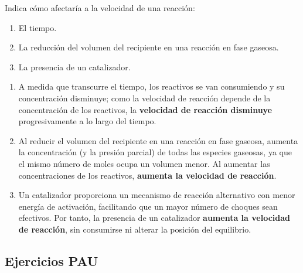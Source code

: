 \begin{question}
    Indica cómo afectaría a la velocidad de una reacción:
    \begin{enumerate}[label=\letraminuscula]
        \item El tiempo.
        \item La reducción del volumen del recipiente en una reacción en fase gaseosa.
        \item La presencia de un catalizador.
    \end{enumerate}

    \begin{solu}

        \begin{enumerate}[label=\letraminuscula]
            \item A medida que transcurre el tiempo, los reactivos se van consumiendo y su concentración disminuye; como la velocidad de reacción depende de la concentración de los reactivos, la \textbf{velocidad de reacción disminuye} progresivamente a lo largo del tiempo.
            \item Al reducir el volumen del recipiente en una reacción en fase gaseosa, aumenta la concentración (y la presión parcial) de todas las especies gaseosas, ya que el mismo número de moles ocupa un volumen menor. Al aumentar las concentraciones de los reactivos, \textbf{aumenta la velocidad de reacción}.
            \item Un catalizador proporciona un mecanismo de reacción alternativo con menor energía de activación, facilitando que un mayor número de choques sean efectivos. Por tanto, la presencia de un catalizador \textbf{aumenta la velocidad de reacción}, sin consumirse ni alterar la posición del equilibrio.
        \end{enumerate}

    \end{solu}
\end{question}

\subsection{Ejercicios PAU}

